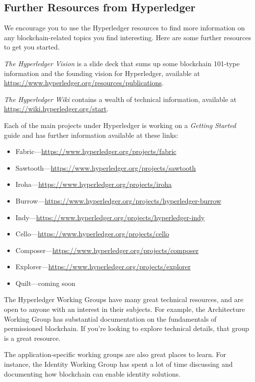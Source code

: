 \subsection{Further Resources from Hyperledger}
We encourage you to use the Hyperledger resources to find more information on any blockchain-related topics you find interesting. Here are some further resources to get you started. 

\emph{The Hyperledger Vision} is a slide deck that sums up some blockchain 101-type information and the founding vision for Hyperledger, available at \url{https://www.hyperledger.org/resources/publications}. 
 
\emph{The Hyperledger Wiki} contains a wealth of technical information, available at \url{https://wiki.hyperledger.org/start}.

Each of the main projects under Hyperledger is working on a \emph{Getting Started} guide and has further information available at these links:
\begin{itemize}
\item Fabric---\url{https://www.hyperledger.org/projects/fabric}
\item Sawtooth---\url{https://www.hyperledger.org/projects/sawtooth}
\item Iroha---\url{https://www.hyperledger.org/projects/iroha}
\item Burrow---\url{https://www.hyperledger.org/projects/hyperledger-burrow}
\item Indy---\url{https://www.hyperledger.org/projects/hyperledger-indy}
\item Cello---\url{https://www.hyperledger.org/projects/cello}
\item Composer---\url{https://www.hyperledger.org/projects/composer}
\item Explorer---\url{https://www.hyperledger.org/projects/explorer}
\item Quilt---coming soon \url{}
\end{itemize} 

The Hyperledger Working Groups have many great technical resources, and are open to anyone with an interest in their subjects.  For example, the Architecture Working Group has substantial documentation on the fundamentals of permissioned blockchain. If you're looking to explore technical details, that group is a great resource. 

The application-specific working groups are also great places to learn. For instance, the Identity Working Group has spent a lot of time discussing and documenting how blockchain can enable identity solutions. 
